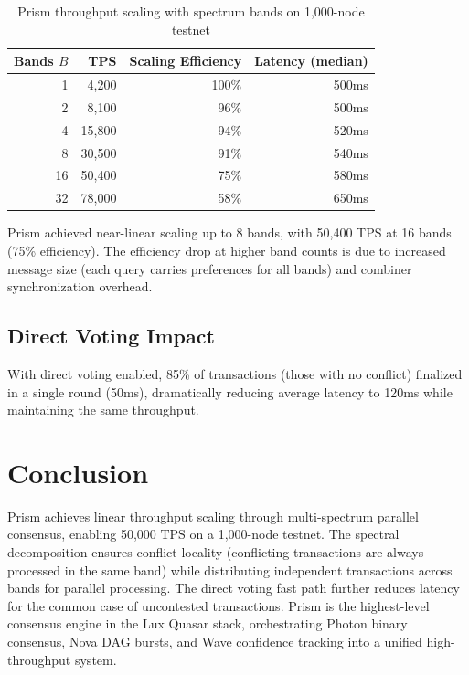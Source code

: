 \documentclass[11pt,a4paper]{article}
\begin{document}
\begin{table}[h]
\centering
\begin{tabular}{@{}rrrr@{}}
\toprule
\textbf{Bands $B$} & \textbf{TPS} & \textbf{Scaling Efficiency} & \textbf{Latency (median)} \\
\midrule
1 & 4,200 & 100\% & 500ms \\
2 & 8,100 & 96\% & 500ms \\
4 & 15,800 & 94\% & 520ms \\
8 & 30,500 & 91\% & 540ms \\
16 & 50,400 & 75\% & 580ms \\
32 & 78,000 & 58\% & 650ms \\
\bottomrule
\end{tabular}
\caption{Prism throughput scaling with spectrum bands on 1,000-node testnet}
\label{tab:scaling}
\end{table}

Prism achieved near-linear scaling up to 8 bands, with 50,400 TPS at 16 bands (75\%
efficiency). The efficiency drop at higher band counts is due to increased message size
(each query carries preferences for all bands) and combiner synchronization overhead.

\subsection{Direct Voting Impact}

With direct voting enabled, 85\% of transactions (those with no conflict) finalized
in a single round (50ms), dramatically reducing average latency to 120ms while
maintaining the same throughput.

\section{Conclusion}
\label{sec:conclusion}

Prism achieves linear throughput scaling through multi-spectrum parallel consensus,
enabling 50,000 TPS on a 1,000-node testnet. The spectral decomposition ensures
conflict locality (conflicting transactions are always processed in the same band)
while distributing independent transactions across bands for parallel processing.
The direct voting fast path further reduces latency for the common case of uncontested
transactions. Prism is the highest-level consensus engine in the Lux Quasar stack,
orchestrating Photon binary consensus, Nova DAG bursts, and Wave confidence tracking
into a unified high-throughput system.
\end{document}
